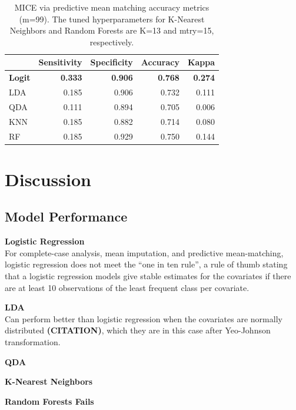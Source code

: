 \documentclass[12pt,]{article}
\begin{document}
\begin{table}[!h]

\caption{\label{tab:unnamed-chunk-8}\label{tab:pmm99-metrics} MICE via predictive mean matching accuracy metrics (m=99).  The tuned hyperparameters for K-Nearest Neighbors and Random Forests are K=13 and mtry=15, respectively.}
\centering
\fontsize{10}{12}\selectfont
\begin{tabular}{lrrrr}
\toprule
  & Sensitivity & Specificity & Accuracy & Kappa\\
\midrule
\textbf{Logit} & \textbf{0.333} & \textbf{0.906} & \textbf{0.768} & \textbf{0.274}\\
LDA & 0.185 & 0.906 & 0.732 & 0.111\\
QDA & 0.111 & 0.894 & 0.705 & 0.006\\
KNN & 0.185 & 0.882 & 0.714 & 0.080\\
RF & 0.185 & 0.929 & 0.750 & 0.144\\
\bottomrule
\end{tabular}
\end{table}

\newpage

\section{Discussion}\label{discussion}

\subsection{Model Performance}\label{model-performance}

\textbf{Logistic Regression}\\
For complete-case analysis, mean imputation, and predictive
mean-matching, logistic regression does not meet the ``one in ten
rule'', a rule of thumb stating that a logistic regression models give
stable estimates for the covariates if there are at least 10
observations of the least frequent class per covariate.

\textbf{LDA}\\
Can perform better than logistic regression when the covariates are
normally distributed \textbf{(CITATION)}, which they are in this case
after Yeo-Johnson transformation.

\textbf{QDA}

\textbf{K-Nearest Neighbors}

\textbf{Random Forests Fails}
\end{document}
